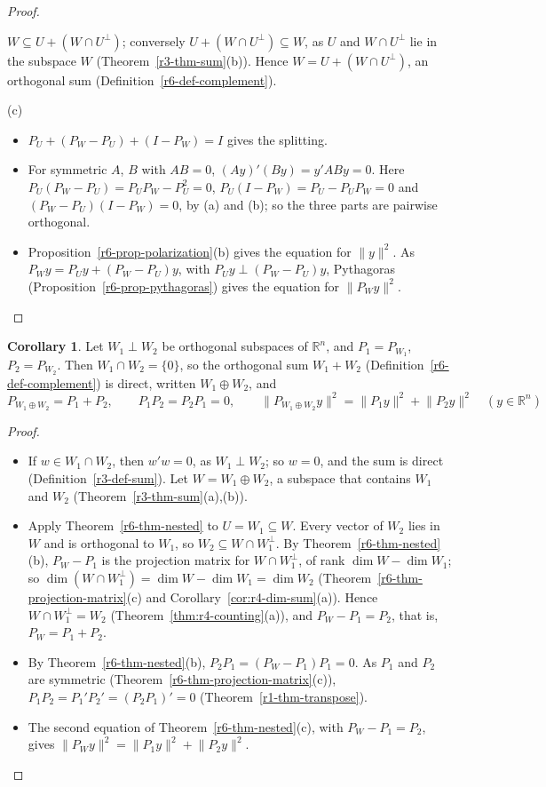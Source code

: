 \documentclass[12pt]{article}
\newcommand{\R}{\mathbb R}
\theoremstyle{definition}
\newtheorem{corollary}[theorem]{Corollary}
\begin{document}
\begin{proof}
\begin{itemize}
\(W\subseteq U+(W\cap U^\perp)\); conversely \(U+(W\cap U^\perp)\subseteq W\), as \(U\) and \(W\cap U^\perp\) lie
in the subspace \(W\) (Theorem~\ref{r3-thm-sum}(b)). Hence \(W=U+(W\cap U^\perp)\), an orthogonal sum
(Definition~\ref{r6-def-complement}).
\end{itemize}
(c)
\begin{itemize}
\item \(P_U+(P_W-P_U)+(I-P_W)=I\) gives the splitting.
\item For symmetric \(A\), \(B\) with \(AB=0\), \((Ay)'(By)=y'ABy=0\). Here \(P_U(P_W-P_U)=P_UP_W-P_U^2=0\),
\(P_U(I-P_W)=P_U-P_UP_W=0\) and \((P_W-P_U)(I-P_W)=0\), by (a) and (b); so the three parts are pairwise
orthogonal.
\item Proposition~\ref{r6-prop-polarization}(b) gives the equation for \(\lVert y\rVert^2\). As
\(P_Wy=P_Uy+(P_W-P_U)y\), with \(P_Uy\perp(P_W-P_U)y\), Pythagoras (Proposition~\ref{r6-prop-pythagoras}) gives the
equation for \(\lVert P_Wy\rVert^2\).\qedhere
\end{itemize}
\end{proof}

\begin{corollary}\label{r6-cor-orthogonal-sum}
Let \(W_1\perp W_2\) be orthogonal subspaces of \(\R^n\), and \(P_1=P_{W_1}\), \(P_2=P_{W_2}\). Then
\(W_1\cap W_2=\{0\}\), so the orthogonal sum \(W_1+W_2\) (Definition~\ref{r6-def-complement}) is direct, written
\(W_1\oplus W_2\), and
\[
P_{W_1\oplus W_2}=P_1+P_2,\qquad P_1P_2=P_2P_1=0,\qquad
\lVert P_{W_1\oplus W_2}y\rVert^2=\lVert P_1y\rVert^2+\lVert P_2y\rVert^2\quad(y\in\R^n)
\]
\end{corollary}
\begin{proof}
\begin{itemize}
\item If \(w\in W_1\cap W_2\), then \(w'w=0\), as \(W_1\perp W_2\); so \(w=0\), and the sum is direct
(Definition~\ref{r3-def-sum}). Let \(W=W_1\oplus W_2\), a subspace that contains \(W_1\) and \(W_2\)
(Theorem~\ref{r3-thm-sum}(a),(b)).
\item Apply Theorem~\ref{r6-thm-nested} to \(U=W_1\subseteq W\). Every vector of \(W_2\) lies in \(W\) and is
orthogonal to \(W_1\), so \(W_2\subseteq W\cap W_1^\perp\). By Theorem~\ref{r6-thm-nested}(b), \(P_W-P_1\) is the
projection matrix for \(W\cap W_1^\perp\), of rank \(\dim W-\dim W_1\); so
\(\dim(W\cap W_1^\perp)=\dim W-\dim W_1=\dim W_2\) (Theorem~\ref{r6-thm-projection-matrix}(c) and
Corollary~\ref{cor:r4-dim-sum}(a)). Hence \(W\cap W_1^\perp=W_2\) (Theorem~\ref{thm:r4-counting}(a)), and
\(P_W-P_1=P_2\), that is, \(P_W=P_1+P_2\).
\item By Theorem~\ref{r6-thm-nested}(b), \(P_2P_1=(P_W-P_1)P_1=0\). As \(P_1\) and \(P_2\) are symmetric
(Theorem~\ref{r6-thm-projection-matrix}(c)), \(P_1P_2=P_1'P_2'=(P_2P_1)'=0\) (Theorem~\ref{r1-thm-transpose}).
\item The second equation of Theorem~\ref{r6-thm-nested}(c), with \(P_W-P_1=P_2\), gives
\(\lVert P_Wy\rVert^2=\lVert P_1y\rVert^2+\lVert P_2y\rVert^2\).\qedhere
\end{itemize}
\end{proof}
\end{document}

